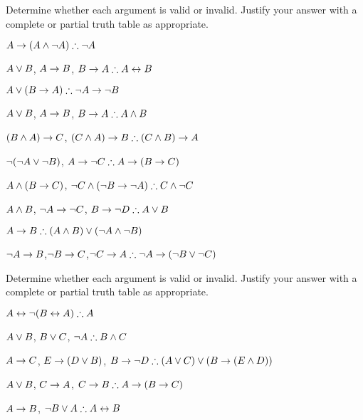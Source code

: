 \noindent\problempart Determine whether each argument is valid or invalid. Justify your answer with a complete or partial truth table as appropriate.
\label{pr.TT.valid5} 
\begin{compactlist}
\item $A\eif(A\eand\enot A)\therefore \enot A$ \hfill {}
\item $A \vee B$, $A \rightarrow B$, $B \eif A \therefore  A \eiff B$  \hfill {}
\item $A\eor(B\eif A)\therefore \enot A \eif \enot B$ \hfill {}
\item $A \vee B$, $A \rightarrow B$, $ B \eif A \therefore  A \eand B$ \hfill {}
\item $(B\wedge A)\rightarrow C$, $(C\eand A)\eif B\therefore (C\eand B)\eif A$ \hfill {}
\item $\neg (\neg A \vee \neg B)$, $A \eif \enot C \therefore  A \eif (B \eif C)$ \hfill {}
\item $A \wedge (B \rightarrow C)$, $\enot C \eand (\enot B \eif \enot A)\therefore C \eand \enot C$ \hfill {}
\item $A \wedge B$, $\neg A \rightarrow \neg C$, $B \eif \enot D \therefore  A \eor B$ \hfill {}
\item $A \eif B\therefore (A \eand B) \eor (\enot A \eand \enot B)$ \hfill {}
\item $\neg A \rightarrow B$,$ \neg B \rightarrow C $,$ \enot C \eif A \therefore  \enot A \eif (\enot B \eor \enot C)$ \hfill {}

\end{compactlist}

\noindent\problempart Determine whether each argument is valid or invalid. Justify your answer with a complete or partial truth table as appropriate.
\label{pr.TT.valid6} 
\begin{compactlist}
\item $A\eiff\enot(B\eiff A)\therefore A$ \hfill {}
\item $A\vee B$, $B\vee C$, $\enot A\therefore B \eand C$ \hfill {}
\item $A \rightarrow C$, $E \rightarrow (D \vee B)$, $B \eif \enot D\therefore (A \eor C) \eor (B \eif (E \eand D))$ \hfill {}
\item $A \vee B$, $C \rightarrow A$, $C \eif B\therefore A \eif (B \eif C)$ \hfill {}
\item $A \rightarrow B$, $\enot B \eor A\therefore A \eiff B$ \hfill {}
\end{compactlist}


